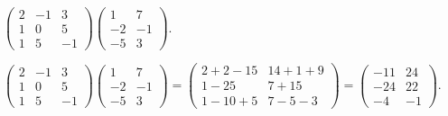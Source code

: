 \documentclass{ximera}
\begin{document}
\begin{exercise}  \label{c4.6.0d}
$\left(\begin{array}{rrr} 2 & -1 &3\\ 1 & 0 & 5\\1 & 5 & -1\end{array}\right)
\left(\begin{array}{rrr} 1 & 7 \\ -2 & -1 \\ -5 & 3\end{array}\right)$.

\begin{solution}

$\left(\begin{array}{rrr} 2 &  -1 &3\\ 1 & 0 & 5 \\1 & 5 & -1
\end{array}\right)
\left(\begin{array}{rrr} 1 & 7 \\ -2 & -1 \\ -5 & 3\end{array}\right)
= \left(\begin{array}{cc} 2+2-15 & 14+1+9 \\ 1-25 & 7+15 \\
1-10+5 & 7-5-3 \end{array}\right)
= \left(\begin{array}{rr} -11 & 24 \\ -24 & 22 \\ -4 & -1
\end{array}\right)$.


\end{solution}
\end{exercise}
\end{document}
